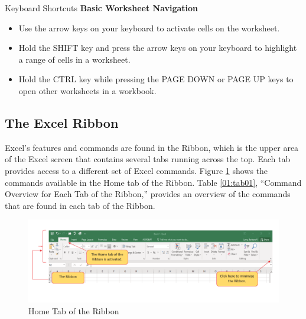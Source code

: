 \begin{center}
	\begin{shtcutbox}{Keyboard Shortcuts}
		\textbf{Basic Worksheet Navigation}
		\\
		\begin{itemize}
			\setlength{\itemsep}{0pt}
			\setlength{\parskip}{0pt}
			\setlength{\parsep}{0pt}

			\item Use the arrow keys on your keyboard to activate cells on the worksheet.
			\item Hold the SHIFT key and press the arrow keys on your keyboard to highlight a range of cells in a worksheet.
			\item Hold the CTRL key while pressing the PAGE DOWN or PAGE UP keys to open other worksheets in a workbook.

		\end{itemize}
	\end{shtcutbox}
\end{center}

\subsection{The Excel Ribbon}

Excel's features and commands are found in the Ribbon, which is the upper area of the Excel screen that contains several tabs running across the top. Each tab provides access to a different set of Excel commands. Figure \ref{01:fig06} shows the commands available in the Home tab of the Ribbon. Table \ref{01:tab01}, ``Command Overview for Each Tab of the Ribbon,'' provides an overview of the commands that are found in each tab of the Ribbon.

\begin{figure}[H]
	\centering
	\includegraphics[width=\maxwidth{.95\linewidth}]{gfx/Ch01_fig06}
	\caption{Home Tab of the Ribbon}
	\label{01:fig06}
\end{figure}

